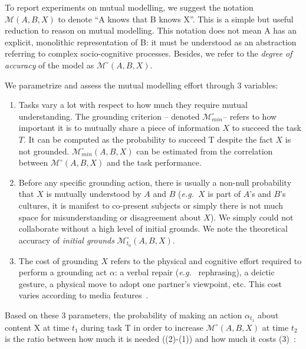 \documentclass[twocolumn]{article}
\newcommand{\eg}{{\textit{e.g.\ }}}
\newcommand{\model}[3]{{$\mathcal{M}(#1, #2, #3)$}}
\newcommand{\Model}[3]{{$\mathcal{M}^{\circ}(#1, #2, #3)$}}
\newcommand{\groundingcriterion}{{$\mathcal{M}^{\circ}_{min}$}}
\begin{document}
To report experiments on mutual modelling, we suggest
the notation \model{A}{B}{X} to denote ``A knows that B knows X''. This is a
simple but useful reduction to reason on mutual modelling. This
notation does not mean A has an explicit, monolithic representation of B: it
must be understood as an abstraction referring to complex socio-cognitive
processes. Besides, we refer to the \emph{degree of accuracy} of the model as
\Model{A}{B}{X}.

We parametrize and assess the mutual modelling effort through 3 variables:

\begin{enumerate}

    \item Tasks vary a lot with respect to how much they require mutual
        understanding.  The grounding
        criterion -- denoted \groundingcriterion -- refers to how
        important it is to mutually share a piece of information $X$ to succeed
        the task $T$. It can be computed as the probability to succeed T despite
        the fact $X$ is not grounded. $\mathcal{M}^{\circ}_{min}(A,B,X)$ can be
        estimated from the correlation between \Model{A}{B}{X} and the task
        performance. 

    \item Before any specific grounding action, there is usually a non-null probability
        that $X$ is mutually understood by $A$ and $B$ (\eg $X$
        is part of $A$'s and $B$'s cultures, it is manifest to co-present
        subjects or simply there is not much space for misunderstanding
        or disagreement about $X$). We simply could not collaborate without a high level of initial
        grounds. We note the theoretical accuracy of \emph{initial grounds}
        $\mathcal{M}^{\circ}_{t_0}(A,B,X)$.

    \item The cost of grounding $X$ refers to the physical and cognitive effort
        required to perform a grounding act $\alpha$: a verbal repair (\eg
        rephrasing), a deictic gesture, a physical move to adopt one partner's
        viewpoint, etc. This cost varies according to media
        features~\cite{clark1991grounding}.

\end{enumerate}

Based on these 3 parameters, the probability of making an action $\alpha_{t_1}$ about
content X at time $t_1$ during task T in order to increase \Model{A}{B}{X}
at time $t_2$ is the ratio between how much it is needed  ((2)-(1)) and how much it
costs (3)~\citep{traum1996miscommunication}:
\end{document}
